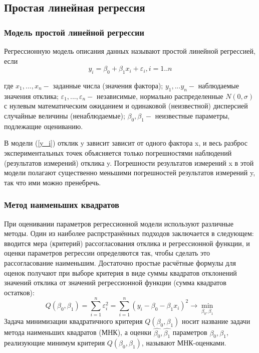 \documentclass[a4paper]{article}
\begin{document}
\subsection{Простая линейная регрессия}
	\subsubsection{Модель простой линейной регрессии}
	\noindent Регрессионную модель описания данных называют простой линейной регрессией, если
	\begin{equation}
	    y_{i} = \beta_{0} + \beta_{1}x_{i} + \varepsilon_{i},  i = 1..n
	    \label{y_i}
	\end{equation}

	\noindent где $x_1,...,x_n - $ заданные числа (значения фактора);
	$y_1,...y_n - $ наблюдаемые значения отклика;
	$\varepsilon_1,...,\varepsilon_n - $ независимые, нормально распределенные $N(0, \sigma)$ с нулевым математическим ожиданием и одинаковой (неизвестной) дисперсией случайные величины (ненаблюдаемые);
	$\beta_0, \beta_1 - $ неизвестные параметры, подлежащие оцениванию.
	
    \noindent В модели (\ref{y_i}) отклик y зависит зависит от одного фактора x, и весь разброс экспериментальных точек объясняется только погрешностями наблюдений (результатов измерений) отклика y. Погрешности результатов измерений x в этой модели полагают существенно меньшими погрешностей результатов измерений y, так что ими можно пренебречь.

	\subsubsection{Метод наименьших квадратов}
	\noindent При оценивании параметров регрессионной модели используют различные методы. Один из наиболее распрстранённых подходов заключается в следующем: вводится мера (критерий) рассогласования отклика и регрессионной функции, и оценки параметров регрессии определяются так, чтобы сделать это рассогласование наименьшим. Достаточно простые расчётные формулы для оценок получают при выборе критерия в виде суммы квадратов отклонений значений отклика от значений регрессионной функции (сумма квадратов остатков):
	\begin{equation}
	    Q(\beta_{0}, \beta_{1}) = \sum_{i=1}^{n}{\varepsilon_{i}^{2}} = 
	    \sum_{i=1}^{n}{(y_{i} - \beta_{0} - \beta_{1}x_{i})^{2}}\rightarrow \min_{\beta_{0}, \beta_{1}}
	    \label{Q_beta}
	\end{equation}
	Задача минимизации квадратичного критерия $Q(\beta_0, \beta_1)$ носит название задачи метода наименьших квадратов (МНК), а оценки $\hat{\beta_0}, \hat{\beta_1}$ параметров $\beta_0, \beta_1$, реализующие минимум критерия $Q(\beta_0, \beta_1)$, называют МНК-оценками. 
\end{document}
